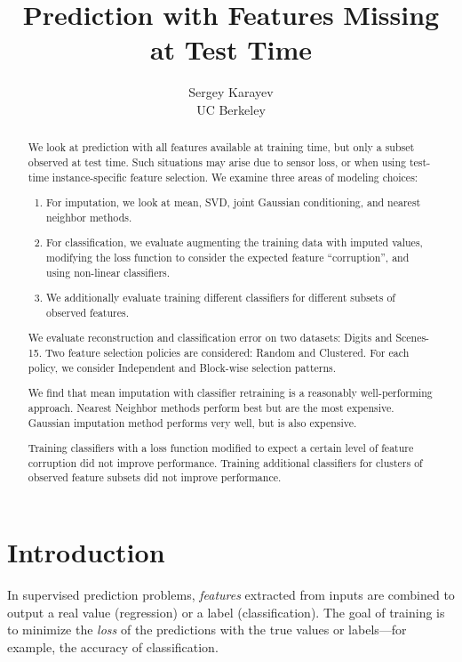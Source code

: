 \title{Prediction with Features Missing at Test Time}

\author{
Sergey Karayev \\
UC Berkeley
}

\nipsfinalcopy

\maketitle

\begin{abstract}
We look at prediction with all features available at training time, but only a subset observed at test time.
Such situations may arise due to sensor loss, or when using test-time instance-specific feature selection.
We examine three areas of modeling choices:

\begin{enumerate}
\item For imputation, we look at mean, SVD, joint Gaussian conditioning, and nearest neighbor methods.

\item For classification, we evaluate augmenting the training data with imputed values, modifying the loss function to consider the expected feature ``corruption'', and using non-linear classifiers.

\item We additionally evaluate training different classifiers for different subsets of observed features.
\end{enumerate}

We evaluate reconstruction and classification error on two datasets: Digits and Scenes-15.
Two feature selection policies are considered: Random and Clustered.
For each policy, we consider Independent and Block-wise selection patterns.

We find that mean imputation with classifier retraining is a reasonably well-performing approach.
Nearest Neighbor methods perform best but are the most expensive.
Gaussian imputation method performs very well, but is also expensive.

Training classifiers with a loss function modified to expect a certain level of feature corruption did not improve performance.
Training additional classifiers for clusters of observed feature subsets did not improve performance.

\end{abstract}

\section{Introduction}
In supervised prediction problems, \emph{features} extracted from inputs are combined to output a real value (regression) or a label (classification).
The goal of training is to minimize the \emph{loss} of the predictions with the true values or labels---for example, the accuracy of classification.

